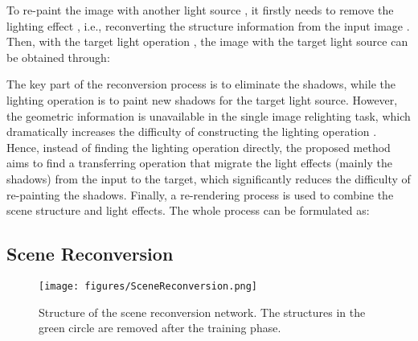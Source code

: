 \documentclass[runningheads]{llncs}
\begin{document}
\baselineskip 

To re-paint the image  with another light source , it firstly needs to remove the lighting effect , i.e., reconverting the structure information  from the input image . Then, with the target light operation , the image   with the target light source can be obtained through:
\vskip -0.4cm
\baselineskip 

\baselineskip 

The key part of the reconversion process  is to eliminate the shadows, while the lighting operation  is to paint new shadows for the target light source. However, the geometric information is unavailable in the single image relighting task, which dramatically increases the difficulty of constructing the lighting operation . Hence, instead of  finding the lighting operation  directly, the proposed method aims to find a transferring operation  that migrate the light effects (mainly the shadows) from the input to the target, which significantly reduces the difficulty of re-painting the shadows. Finally, 
a re-rendering process  is used to combine the scene structure and light effects. The whole process can be formulated as:
\vskip -0.4cm
\baselineskip 

\baselineskip 

\vskip -0.5cm
\baselineskip 
\subsection{Scene Reconversion}\label{Scene Reconversion}

\begin{figure}[t]
    \centering
    \texttt{[image: figures/SceneReconversion.png]}
   \baselineskip 
    \caption{Structure of the scene reconversion network. The structures in the green circle are removed after the training phase.}
    \label{fig:scene_recon}
   \baselineskip 
\end{figure}
\end{document}
